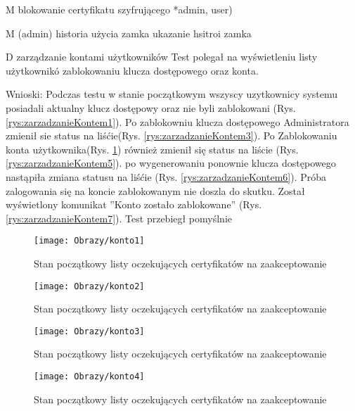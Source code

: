 \begin{enumerate*}
	
	\item M blokowanie certyfikatu szyfrującego *admin, user)
	\item M (admin) historia użycia zamka
	ukazanie hsitroi zamka
	\item D zarządzanie kontami użytkowników
		Test polegał na wyświetleniu listy użytkownikó zablokowaniu klucza dostępowego oraz konta.
		
		Wnioski: Podczas testu w stanie początkowym wszyscy uzytkownicy systemu posiadali aktualny klucz dostępowy oraz nie byli zablokowani (Rys. \ref{rys:zarzadzanieKontem1}). Po zablokowniu klucza dostępowego  Administratora zmienił sie status na liśćie(Rys. \ref{rys:zarzadzanieKontem3}). Po Zablokowaniu konta użytkownika(Rys. \ref{rys:zarzadzanieKontem4}) również zmienił się status na liście (Rys. \ref{rys:zarzadzanieKontem5}). po wygenerowaniu ponownie klucza dostępowego nastąpiła zmiana statusu na liśćie (Rys. \ref{rys:zarzadzanieKontem6}). Próba zalogowania się na koncie zablokowanym nie doszla do skutku. Został wyświetlony komunikat ''Konto zostało zablokowane'' (Rys. \ref{rys:zarzadzanieKontem7}). Test przebiegł pomyślnie
		
		
				\begin{figure}[ht!]
					\begin{minipage}{0.2\textwidth}
						\texttt{[image: Obrazy/konto1]}
						\caption{Stan początkowy listy oczekujących certyfikatów na zaakceptowanie }
						\label{rys:zarzadzanieKontem1}
					\end{minipage}
				\begin{minipage}{0.2\textwidth}
					\texttt{[image: Obrazy/konto2]}
					\caption{Stan początkowy listy oczekujących certyfikatów na zaakceptowanie }
					\label{rys:zarzadzanieKontem2}
				\end{minipage}
			
			\begin{minipage}{0.2\textwidth}
				\texttt{[image: Obrazy/konto3]}
				\caption{Stan początkowy listy oczekujących certyfikatów na zaakceptowanie }
				\label{rys:zarzadzanieKontem3}
			\end{minipage}
			
			\begin{minipage}{0.2\textwidth}
				\texttt{[image: Obrazy/konto4]}
				\caption{Stan początkowy listy oczekujących certyfikatów na zaakceptowanie }
				\label{rys:zarzadzanieKontem4}
			\end{minipage}
			

\end{figure}
\end{enumerate*}
